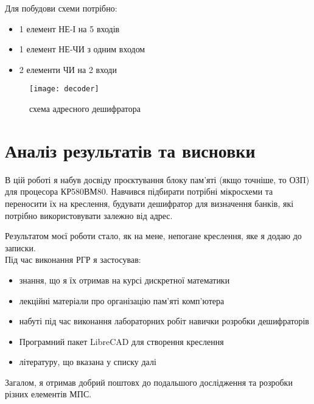 \documentclass[a4paper, 12pt, oneside]{extreport}
\begin{document}
Для побудови схеми потрібно:

\begin{itemize}
	\item 1 елемент НЕ-І на 5 входів
	\item 1 елемент НЕ-ЧИ з одним входом
	\item 2 елементи ЧИ на 2 входи
\end{itemize}

\begin{figure}[h]
	\centering
	\texttt{[image: decoder]}
	\caption{схема адресного дешифратора}
\end{figure}

\chapter*{Аналіз результатів та висновки}

В цій роботі я набув досвіду проєктування блоку пам'яті
(якщо точніше, то ОЗП) для процесора КР580ВМ80.
Навчився підбирати потрібні мікросхеми та переносити
їх на креслення, будувати дешифратор для визначення
банків, які потрібно використовувати залежно від адрес.

Результатом моєї роботи стало, як на мене,
непогане креслення, яке я додаю до записки. \\

Під час виконання РГР я застосував:

\begin{itemize}
\item знання, що я їх отримав на курсі дискретної математики
\item лекційні матеріали про організацію пам'яті комп'ютера
\item набуті під час виконання лабораторних робіт навички розробки дешифраторів
\item Програмний пакет LibreCAD для створення креслення
\item літературу, що вказана у списку далі
\end{itemize}

Загалом, я отримав добрий поштовх до подальшого дослідження
та розробки різних елементів МПС.

\nocite{circ}
\printbibliography
\end{document}
